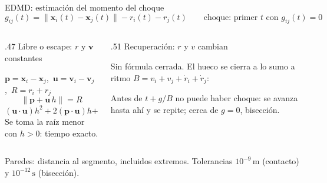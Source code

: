 \documentclass[aspectratio=169,20pt]{beamer}
\newcommand{\vb}[1]{\mathbf{#1}}
\newcommand{\un}[1]{\,\mathrm{#1}}
\newcommand{\notaBreve}[1]{{\fontsize{18}{22}\selectfont #1}}
\begin{document}
\begin{frame}{EDMD: estimación del momento del choque}
\[
 g_{ij}(t)=\|\vb x_i(t)-\vb x_j(t)\|-r_i(t)-r_j(t)\qquad\text{choque: primer }t\text{ con }g_{ij}(t)=0
\]
\begin{columns}[T]
\begin{column}{.47\textwidth}
\textcolor{ED}{Libre o escape: $r$ y $\vb v$ constantes}
\par\notaBreve{$\vb p=\vb x_i-\vb x_j$,\ $\vb u=\vb v_i-\vb v_j$,\ $R=r_i+r_j$}
\[
 \|\vb p+\vb u\,h\|=R
\]
\[
 (\vb u\!\cdot\!\vb u)h^2+2(\vb p\!\cdot\!\vb u)h+\|\vb p\|^2-R^2=0
\]
Se toma la raíz menor con $h>0$: tiempo exacto.
\end{column}
\begin{column}{.51\textwidth}
\textcolor{HY}{Recuperación: $r$ y $v$ cambian}
\par Sin fórmula cerrada. El hueco se cierra a lo sumo a ritmo $B=v_i+v_j+\dot r_i+\dot r_j$:
\par\centering
{}
\par\raggedright Antes de $t+g/B$ no puede haber choque: se avanza hasta ahí y se repite; cerca de $g=0$, bisección.
\end{column}
\end{columns}
\vfill\notaBreve{Paredes: distancia al segmento, incluidos extremos. Tolerancias $10^{-9}\un{m}$ (contacto) y $10^{-12}\un{s}$ (bisección).}
\end{frame}
\end{document}
